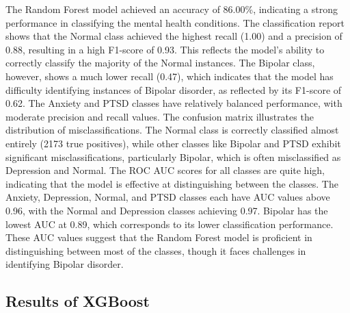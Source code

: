 \noindent
The Random Forest model achieved an accuracy of 86.00\%, indicating a strong performance in classifying the mental health conditions. The classification report shows that the Normal class achieved the highest recall (1.00) and a precision of 0.88, resulting in a high F1-score of 0.93. This reflects the model’s ability to correctly classify the majority of the Normal instances. The Bipolar class, however, shows a much lower recall (0.47), which indicates that the model has difficulty identifying instances of Bipolar disorder, as reflected by its F1-score of 0.62. The Anxiety and PTSD classes have relatively balanced performance, with moderate precision and recall values. The confusion matrix illustrates the distribution of misclassifications. The Normal class is correctly classified almost entirely (2173 true positives), while other classes like Bipolar and PTSD exhibit significant misclassifications, particularly Bipolar, which is often misclassified as Depression and Normal. The ROC AUC scores for all classes are quite high, indicating that the model is effective at distinguishing between the classes. The Anxiety, Depression, Normal, and PTSD classes each have AUC values above 0.96, with the Normal and Depression classes achieving 0.97. Bipolar has the lowest AUC at 0.89, which corresponds to its lower classification performance. These AUC values suggest that the Random Forest model is proficient in distinguishing between most of the classes, though it faces challenges in identifying Bipolar disorder.




\subsection{Results of XGBoost}

